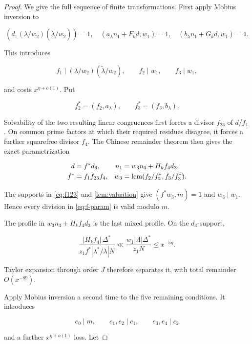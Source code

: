 \begin{proof}
We give the full sequence of finite transformations.  First apply Mobius
inversion to

\[
 (d,(\lambda/w_2)(\widetilde\lambda/w_2))=1,
 \quad(a_\lambda n_1+F_kd,w_1)=1,
 \quad(b_\lambda n_1+G_kd,w_1)=1.
\]

This introduces

\begin{equation}\label{eq:f123}
 f_1\mid(\lambda/w_2)(\widetilde\lambda/w_2),\qquad
 f_2\mid w_1,\qquad f_3\mid w_1,
\end{equation}

and costs $x^{\eta+o(1)}$.  Put

\[
 f_2^*=(f_2,a_\lambda),\qquad
 f_3^*=(f_3,b_\lambda).
\]

Solvability of the two resulting linear congruences first forces a divisor
$f_{23}$ of $d/f_1$.  On common prime factors at which their required
residues disagree, it forces a further squarefree divisor $f_4$.  The
Chinese remainder theorem then gives the exact parametrization

\begin{equation}\label{eq:f-param}
 \begin{aligned}
 d&=f^*d_3,&
 n_1&=w_3n_3+H_kf_4d_3,\\
 f^*&=f_1f_{23}f_4,&
 w_3&=\operatorname{lcm}(f_2/f_2^*,f_3/f_3^*).
 \end{aligned}
\end{equation}

The supports in \cref{eq:f123} and \cref{lem:valuation} give
$(f^*w_3,m)=1$ and $w_3\mid w_1$.  Hence every division in
\cref{eq:f-param} is valid modulo $m$.

The profile in $w_3n_3+H_kf_4d_3$ is the last mixed profile.  On the
$d_3$-support,

\[
 \frac{|H_kf_4|\,\Delta^*}{z_1f^*|\lambda^*/\lambda|N}
 \ll \frac{w_1|\Lambda|\Delta^*}{z_1N}
 \le x^{-5\eta}.
\]

Taylor expansion through order $J$ therefore separates it, with total
remainder $O(x^{-89})$.

Apply Mobius inversion a second time to the five remaining conditions.  It
introduces

\begin{equation}\label{eq:e01234}
 e_0\mid m,\qquad e_1,e_2\mid c_1,\qquad e_3,e_4\mid c_2
\end{equation}

and a further $x^{\eta+o(1)}$ loss.  Let


\end{proof}
